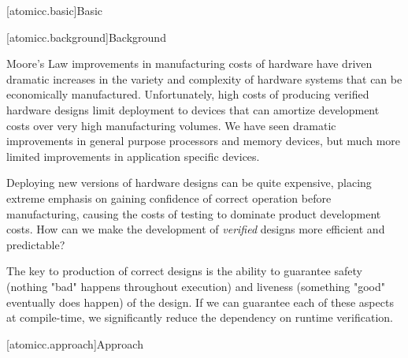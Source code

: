 [atomicc.basic]{Basic}

[atomicc.background]{Background}

Moore's Law improvements in manufacturing
costs of hardware have driven dramatic increases in the variety and complexity
of hardware systems that can be economically manufactured.
Unfortunately, high costs of producing verified hardware designs limit
deployment to devices that
can amortize development costs over very high manufacturing volumes.
We have seen dramatic improvements in general purpose processors
and memory devices, but much more limited improvements in application
specific devices.

Deploying new versions of hardware designs can be quite expensive,
placing extreme emphasis on gaining confidence of correct operation before
manufacturing, causing the costs of testing to
dominate product development costs.
How can we make the development of 
\textit{verified} designs more efficient and predictable?

The key to production of correct designs is the ability to guarantee
safety (nothing "bad" happens throughout execution)
and liveness (something "good" eventually does happen) of the design.
If we can guarantee each of these aspects at compile-time,
we significantly reduce the dependency on runtime verification.

[atomicc.approach]{Approach}

